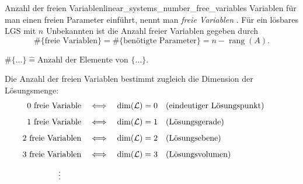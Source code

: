\begin{KeyPointBox}{Anzahl der freien Variablen}{linear_systems_number_free_variables}
  Variablen für man einen freien Parameter einführt, nennt man \emph{freie Variablen} 
  . Für ein lösbares LGS mit $n$ Unbekannten ist die Anzahl
  freier Variablen gegeben durch
  \[
    \#\{\text{freie Variablen}\}
    = \#\{\text{benötigte Parameter}\}
    =n-\operatorname{rang}(A).
  \]
  \par\smallskip
  \hfill
  {\footnotesize\color{black!55}
    $\#\{\ldots\}\mathrel{\widehat{=}}\text{Anzahl der Elemente von }\{\ldots\}$.}
\end{KeyPointBox}


Die Anzahl der freien Variablen bestimmt zugleich die Dimension der
Lösungsmenge:
\[
  \begin{aligned}
    0\ \text{freie Variable}
    &\quad\Longleftrightarrow\quad
    \dim(\mathcal L)=0 \quad \text{(eindeutiger Lösungspunkt)} \\[0.5em]
    1\ \text{freie Variable}
    &\quad\Longleftrightarrow\quad
    \dim(\mathcal L)=1 \quad \text{(Lösungsgerade)} \\[0.5em]
    2\ \text{freie Variablen}
    &\quad\Longleftrightarrow\quad
    \dim(\mathcal L)=2 \quad \text{(Lösungsebene)} \\[0.5em]
    3\ \text{freie Variablen}
    &\quad\Longleftrightarrow\quad
    \dim(\mathcal L)=3 \quad \text{(Lösungsvolumen)} \\[0.5em]
    &\hspace{-2.8em}\vdots &&
  \end{aligned}
\]
